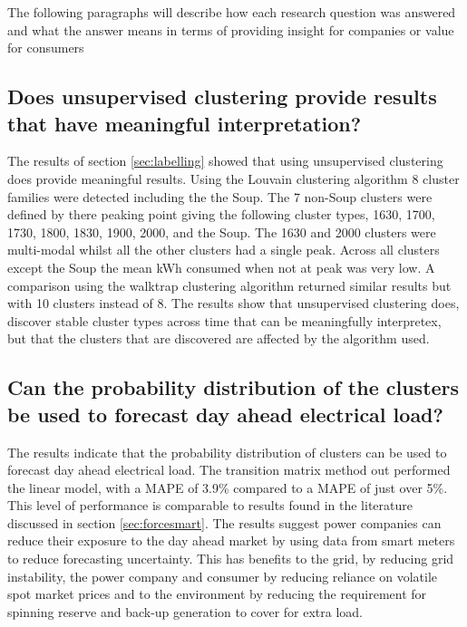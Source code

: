 The following paragraphs will describe how each research question was answered and what the answer means in terms of providing insight for companies or value for consumers

\subsection{Does unsupervised clustering provide results that have meaningful interpretation?}
The results of section \ref{sec:labelling} showed that using unsupervised clustering does provide meaningful results. Using the Louvain clustering algorithm 8 cluster families were detected including the the Soup. The 7 non-Soup clusters were defined by there peaking point giving the following cluster types,  1630, 1700, 1730, 1800, 1830, 1900, 2000, and the Soup. The 1630 and 2000 clusters were multi-modal whilst all the other clusters had a single peak. Across all clusters except the Soup the mean kWh consumed when not at peak was very low. A comparison using the walktrap clustering algorithm returned similar results but with 10 clusters instead of 8. The results show that unsupervised clustering does, discover stable cluster types across time that can be meaningfully interpretex, but that the clusters that are discovered are affected by the algorithm used.


\subsection{Can the probability distribution of the clusters be used to forecast day ahead electrical load?}
The results indicate that the probability distribution of clusters can be used to forecast day ahead electrical load. The transition matrix method out performed the linear model, with a MAPE of 3.9\% compared to a MAPE of just over 5\%. This level of performance is comparable to results found in the literature discussed in section \ref{sec:forcesmart}. The results suggest power companies can reduce their exposure to the day ahead market by using data from smart meters to reduce forecasting uncertainty. This has benefits to the grid, by reducing grid instability, the power company and consumer by reducing  reliance on volatile spot market prices and to the environment by reducing the requirement for spinning reserve and back-up generation to cover for extra load. 

